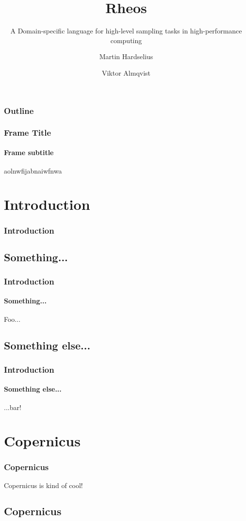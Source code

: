 \documentclass[10pt]{beamer}
\begin{document}
\title{Rheos}
\subtitle{A Domain-specific language for high-level sampling tasks in
  high-performance computing}
\author[Hardselius \and Almqvist]{Martin Hardselius \and Viktor Almqvist}


\begin{frame}
  \titlepage
\end{frame}


\begin{frame}
\frametitle{Outline}
\tableofcontents[pausesections]
\end{frame}


\begin{frame}
  \frametitle{Frame Title}
  \framesubtitle{Frame subtitle}

  aolnwfijabnaiwfnwa
\end{frame}


\section{Introduction}
\begin{frame}
  \frametitle{Introduction}
\end{frame}


\subsection{Something...}


\begin{frame}
  \frametitle{Introduction}
  \framesubtitle{Something...}
  Foo...
\end{frame}


\subsection{Something else...}


\begin{frame}
  \frametitle{Introduction}
  \framesubtitle{Something else...}
  ...bar!
\end{frame}


\section{Copernicus}


\begin{frame}
  \frametitle{Copernicus}
  Copernicus is kind of cool!
\end{frame}


\subsection{Copernicus}
\end{document}
